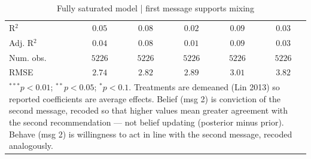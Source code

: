 \begin{table}
\begin{center}
\begin{tabular}{l c c c c c}
\hline
R$^2$                                             & $0.05$        & $0.08$        & $0.02$        & $0.09$        & $0.03$        \\
Adj. R$^2$                                        & $0.04$        & $0.08$        & $0.01$        & $0.09$        & $0.03$        \\
Num. obs.                                         & $5226$        & $5226$        & $5226$        & $5226$        & $5226$        \\
RMSE                                              & $2.74$        & $2.82$        & $2.89$        & $3.01$        & $3.82$        \\
\hline
\multicolumn{6}{l}{\scriptsize{\item $^{***}p<0.01$; $^{**}p<0.05$; $^{*}p<0.1$. Treatments are demeaned (Lin 2013) so reported coefficients are average effects. Belief (msg 2) is conviction of the second message, recoded so that higher values mean greater agreement with the second recommendation --- not belief updating (posterior minus prior). Behave (msg 2) is willingness to act in line with the second message, recoded analogously.}}
\end{tabular}
\caption{Fully saturated model | first message supports mixing}
\label{table:saturated_1}
\end{center}
\end{table}

